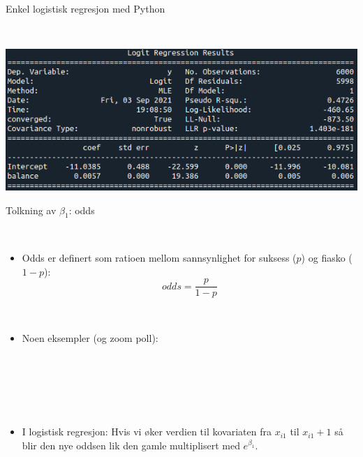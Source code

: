 \documentclass[10pt,ignorenonframetext,]{beamer}
\providecommand{\tightlist}{%
  \setlength{\itemsep}{0pt}\setlength{\parskip}{0pt}}
\begin{document}
\begin{frame}

\begin{block}{Enkel logistisk regresjon med Python}

\(~\)

\includegraphics{default_enkelt.png}

\end{block}

\end{frame}

\begin{frame}

\begin{block}{Tolkning av \(\beta_1\): odds}

\(~\)

\begin{itemize}
\tightlist
\item
  Odds er definert som ratioen mellom sannsynlighet for suksess (\(p\))
  og fiasko (\(1-p\)): \[odds = \frac{p}{1-p}\]
\end{itemize}

\(~\)

\begin{itemize}
\tightlist
\item
  Noen eksempler (og zoom poll):
\end{itemize}

\(~\)

\vspace{5mm}

\(~\)

\(~\)

\begin{itemize}
\tightlist
\item
  I logistisk regresjon: Hvis vi øker verdien til kovariaten fra
  \(x_{i1}\) til \(x_{i1} + 1\) så blir den nye oddsen lik den gamle
  multiplisert med \(e^{\beta_1}\).
\end{itemize}

\end{block}

\end{frame}
\end{document}
